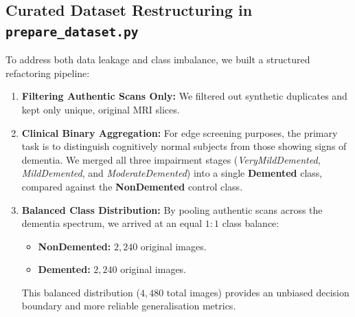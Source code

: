 \documentclass[11pt]{article}
\begin{document}
	\subsection{Curated Dataset Restructuring in \texttt{prepare\_dataset.py}}
	To address both data leakage and class imbalance, we built a structured refactoring pipeline:
	\begin{enumerate}
		\item \textbf{Filtering Authentic Scans Only:} We filtered out synthetic duplicates and kept only unique, original MRI slices.
		\item \textbf{Clinical Binary Aggregation:} For edge screening purposes, the primary task is to distinguish cognitively normal subjects from those showing signs of dementia. We merged all three impairment stages (\textit{VeryMildDemented}, \textit{MildDemented}, and \textit{ModerateDemented}) into a single \textbf{Demented} class, compared against the \textbf{NonDemented} control class.
		\item \textbf{Balanced Class Distribution:} By pooling authentic scans across the dementia spectrum, we arrived at an equal $1:1$ class balance:
		\begin{itemize}
			\item \textbf{NonDemented:} $2,240$ original images.
			\item \textbf{Demented:} $2,240$ original images.
		\end{itemize}
		This balanced distribution ($4,480$ total images) provides an unbiased decision boundary and more reliable generalisation metrics.
	\end{enumerate}
\end{document}
